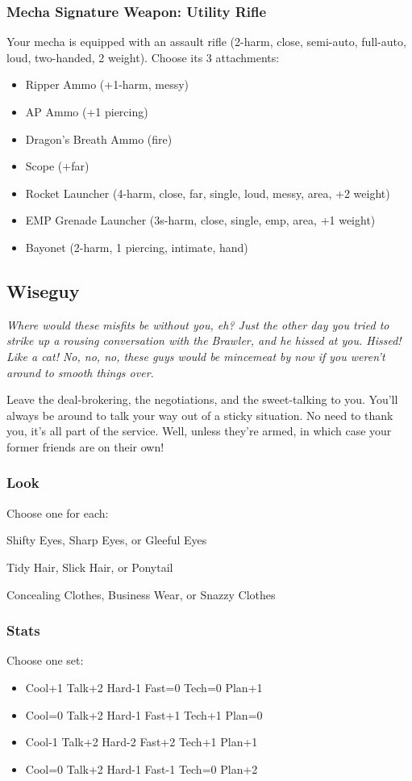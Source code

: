 \subsubsection{Mecha Signature Weapon: Utility Rifle}
Your mecha is equipped with an assault rifle (2-harm, close, semi-auto, full-auto, loud, two-handed, 2 weight). Choose its 3 attachments:
\begin{itemize}
\item Ripper Ammo (+1-harm, messy)
\item AP Ammo (+1 piercing)
\item Dragon's Breath Ammo (fire)
\item Scope (+far)
\item Rocket Launcher (4-harm, close, far, single, loud, messy, area, +2 weight)
\item EMP Grenade Launcher (3s-harm, close, single, emp, area, +1 weight)
\item Bayonet (2-harm, 1 piercing, intimate, hand)
\end{itemize}




\subsection{Wiseguy}
{\itshape Where would these misfits be without you, eh? Just the other day you tried to strike up a rousing conversation with the Brawler, and he \emph{hissed} at you. Hissed! Like a cat! No, no, no, these guys would be mincemeat by now if you weren't around to smooth things over.

Leave the deal-brokering, the negotiations, and the sweet-talking to you. You'll always be around to talk your way out of a sticky situation. No need to thank you, it's all part of the service. Well, unless they're armed, in which case your former friends are on their own!}
\subsubsection{Look}
Choose one for each:

Shifty Eyes, Sharp Eyes, or Gleeful Eyes

Tidy Hair, Slick Hair, or Ponytail

Concealing Clothes, Business Wear, or Snazzy Clothes

\subsubsection{Stats}
Choose one set:
\begin{itemize}
\setlength\itemsep{0em}
\item Cool+1 Talk+2 Hard-1 Fast=0 Tech=0 Plan+1
\item Cool=0 Talk+2 Hard-1 Fast+1 Tech+1 Plan=0
\item Cool-1 Talk+2 Hard-2 Fast+2 Tech+1 Plan+1
\item Cool=0 Talk+2 Hard-1 Fast-1 Tech=0 Plan+2
\end{itemize}

